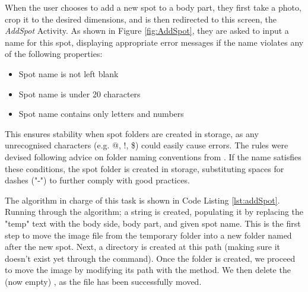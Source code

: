 When the user chooses to add a new spot to a body part, they first take a photo, crop it to the desired dimensions, and is then redirected to this screen, the \emph{AddSpot} Activity. As shown in Figure \ref{fig:AddSpot}, they are asked to input a name for this spot, displaying appropriate error messages if the name violates any of the following properties:
\begin{itemize}
    \item Spot name is not left blank
    \item Spot name is under 20 characters
    \item Spot name contains only letters and numbers
\end{itemize}
This ensures stability when spot folders are created in storage, as any unrecognised characters (e.g. @, !, \$) could easily cause errors. The rules were devised following advice on folder naming conventions from \cite{santaguida_2011}. If the name satisfies these conditions, the spot folder is created in storage, substituting spaces for dashes ("-") to further comply with good practices.

The algorithm in charge of this task is shown in Code Listing \ref{lst:addSpot}. Running through the algorithm; a  string is created, populating it by replacing the "temp" text with the body side, body part, and given spot name. This is the first step to move the image file from the temporary folder into a new folder named after the new spot. Next, a directory  is created at this path (making sure it doesn't exist yet through the  command). Once the folder is created, we proceed to move the image by modifying its path with the  method. We then delete the (now empty) , as the file has been successfully moved.

